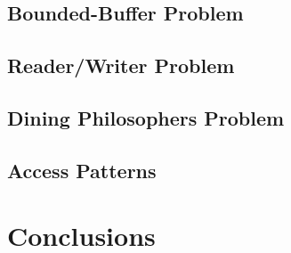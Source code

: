 \documentclass[preprint]{sigplanconf}
\begin{document}
\subsection{Bounded-Buffer Problem}
\subsection{Reader/Writer Problem}
\subsection{Dining Philosophers  Problem}
%
\subsection{Access Patterns}



\section{Conclusions} \label{sec:conclu}
\end{document}
